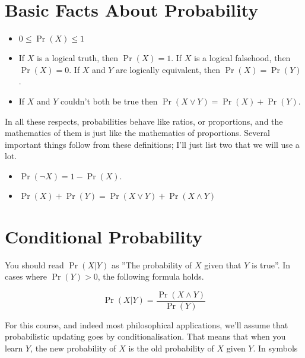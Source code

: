 
\def\mytitle{Probability}
\def\myauthor{Brian Weatherson}
\def\mydate{January 30, 2018}


\section{Basic Facts About Probability}
\label{basicfactsaboutprobability}

\begin{itemize}
\item{} $0 \leq \Pr(X) \leq 1$

\item{} If $X$ is a logical truth, then $\Pr(X) = 1$. If $X$ is a logical falsehood, then $\Pr(X) = 0$. If $X$ and $Y$ are logically equivalent, then $\Pr(X) = \Pr(Y)$.

\item{} If $X$ and $Y$ couldn't both be true then $\Pr(X \vee Y) = \Pr(X) + \Pr(Y)$.

\end{itemize}

In all these respects, probabilities behave like ratios, or proportions, and the mathematics of them is just like the mathematics of proportions. Several important things follow from these definitions; I'll just list two that we will use a lot.

\begin{itemize}
\item{} $\Pr(\neg X) = 1 - \Pr(X)$.

\item{} $\Pr(X) + \Pr(Y) = \Pr(X \vee Y) + \Pr(X \wedge Y)$

\end{itemize}

\section{Conditional Probability}
\label{conditionalprobability}

You should read $\Pr(X | Y)$ as ''The probability of $X$ given that $Y$ is true''. In cases where $\Pr(Y) > 0$, the following formula holds.

\[
\Pr(X | Y) = \frac{\Pr(X \wedge Y)}{\Pr(Y)}
\]

For this course, and indeed most philosophical applications, we'll assume that probabilistic updating goes by conditionalisation. That means that when you learn $Y$, the new probability of $X$ is the old probability of $X$ given $Y$. In symbols

